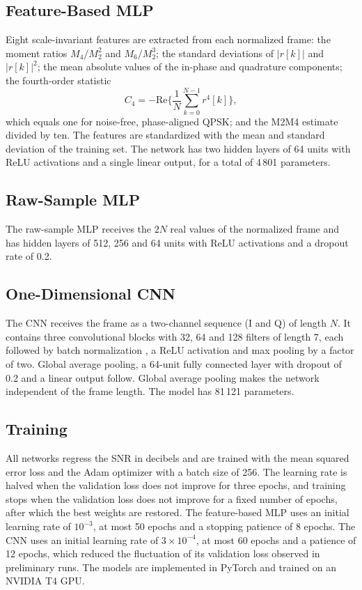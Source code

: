 \documentclass[conference]{IEEEtran}
\begin{document}
\subsection{Feature-Based MLP}

Eight scale-invariant features are extracted from each normalized frame: the moment ratios $M_4/M_2^2$ and $M_6/M_2^3$; the standard deviations of $|r[k]|$ and $|r[k]|^2$; the mean absolute values of the in-phase and quadrature components; the fourth-order statistic
\begin{equation}
C_4 = -\mathrm{Re}\Big\{\frac{1}{N}\sum_{k=0}^{N-1} r^4[k]\Big\},
\label{eq:c4}
\end{equation}
which equals one for noise-free, phase-aligned QPSK; and the M2M4 estimate divided by ten. The features are standardized with the mean and standard deviation of the training set. The network has two hidden layers of 64 units with ReLU activations and a single linear output, for a total of 4\,801 parameters.

\subsection{Raw-Sample MLP}

The raw-sample MLP receives the $2N$ real values of the normalized frame and has hidden layers of 512, 256 and 64 units with ReLU activations and a dropout rate of 0.2.

\subsection{One-Dimensional CNN}

The CNN receives the frame as a two-channel sequence (I and Q) of length $N$. It contains three convolutional blocks with 32, 64 and 128 filters of length 7, each followed by batch normalization \cite{ioffe2015}, a ReLU activation and max pooling by a factor of two. Global average pooling, a 64-unit fully connected layer with dropout of 0.2 and a linear output follow. Global average pooling makes the network independent of the frame length. The model has 81\,121 parameters.

\subsection{Training}

All networks regress the SNR in decibels and are trained with the mean squared error loss and the Adam optimizer \cite{kingma2015} with a batch size of 256. The learning rate is halved when the validation loss does not improve for three epochs, and training stops when the validation loss does not improve for a fixed number of epochs, after which the best weights are restored. The feature-based MLP uses an initial learning rate of $10^{-3}$, at most 50 epochs and a stopping patience of 8 epochs. The CNN uses an initial learning rate of $3 \times 10^{-4}$, at most 60 epochs and a patience of 12 epochs, which reduced the fluctuation of its validation loss observed in preliminary runs. The models are implemented in PyTorch \cite{paszke2019} and trained on an NVIDIA T4 GPU.
\end{document}
